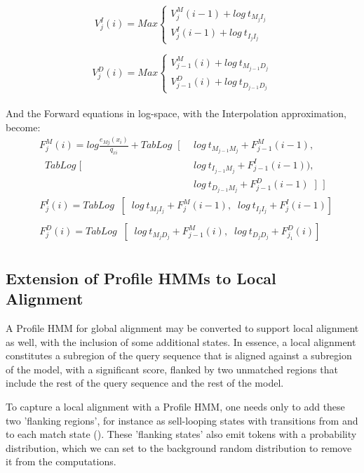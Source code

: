 $$ V^I_j(i) = Max  
		\begin{cases}
			V^M_{j} (i-1) + log\ t_{M_{j} I_j}  \\
			V^I_{j} (i-1) + log\ t_{I_{j} I_j}
		\end{cases} $$

$$V^D_j(i) = Max \begin{cases}
			V^M_{j-1} (i) + log\ t_{M_{j-1} D_j}  \\
			V^D_{j-1} (i) + log\ t_{D_{j-1} D_j} 
		\end{cases} $$ \\

And the Forward equations in log-space, with the Interpolation approximation, become:
\begin{align*}
 F^M_j(i) = log \frac{e_{Mj}(x_i) }{q_{xi}} + TabLog \;\;  
		[\;\; &log\ t_{M_{j-1} M_j} + F^M_{j-1}(i-1), \\
		 \;\;  TabLog \; [ \; &log\ t_{I_{j-1} M_j} + F^I_{j-1}(i-1)), \\
		 \;\;	&log\ t_{D_{j-1} M_j} + F^D_{j-1}(i-1) \;\; ] \;\; ]
\end{align*}
\begin{align*}
&F^I_j(i) = TabLog	\;\; [	\;\; log\ t_{M_{j} I_j} + F^M_{j}(i-1), 
				\;\; log\ t_{I_{j} I_j} + F^I_{j}(i-1) ] \\
\\
&F^D_j(i) = TabLog \;\; [	\;\; log\ t_{M_{j} D_j} + F^M_{j-1}(i),
				\;\; log\ t_{D_{j} D_j} + F^D_{j_1}(i) ]
\\
\end{align*}




\subsection{Extension of Profile HMMs to Local Alignment}

A Profile HMM for global alignment may be converted to support local alignment as well, with the inclusion of some additional states. In essence, a local alignment constitutes a subregion of the query sequence that is aligned against a subregion of the model, with a significant score, flanked by two unmatched regions that include the rest of the query sequence and the rest of the model.

To capture a local alignment with a Profile HMM, one needs only to add these two 'flanking regions', for instance as sell-looping states with transitions from and to each match state (\cite{hmmsbook}). These 'flanking states' also emit tokens with a probability distribution, which we can set to the background random distribution to remove it from the computations. 

